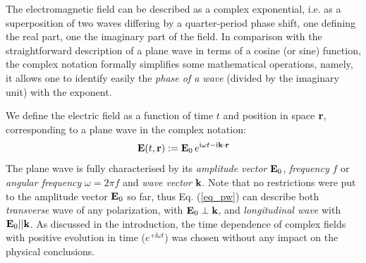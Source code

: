 The electromagnetic field can be described as a complex exponential, i.e. as a superposition of two waves differing by a quarter-period phase shift, one defining the real part, one the imaginary part of the field. In comparison with the straightforward description of a plane wave in terms of a cosine (or sine) function, the complex notation formally simplifies some mathematical operations, namely, it allows one to identify easily the \textit{phase of a wave} (divided by the imaginary unit) with the exponent. 

We define the electric field as a function of time $t$ and position in space ${\mathbf{r}}$, corresponding to a plane wave in the complex notation:
\begin{equation} \mathbf{E}(t, {\mathbf{r}}) := \mathbf{E}_0\, e^{{\mathrm i}\omega t - {\mathrm i}{\mathbf{k}}\cdot{\mathbf{r}}} \label{eq_pw}\end{equation}
The plane wave is fully characterised by its \textit{amplitude vector} $\mathbf{E}_0$, \textit{frequency} $f$ or \textit{angular frequency} $\omega = 2\pi f$ and \textit{wave vector} ${\mathbf{k}}$. Note that no restrictions were put to the amplitude vector $\mathbf{E}_0$ so far, thus Eq. (\ref{eq_pw}) can describe both \textit{transverse} wave of any polarization, with $\mathbf{E}_0 \perp {\mathbf{k}}$, and \textit{longitudinal wave} with $\mathbf{E}_0 || {\mathbf{k}}$.  As discussed in the introduction, the time dependence of complex fields with positive evolution in time ($e^{+\ii\omega t}$)  was chosen without any impact on the physical conclusions.

